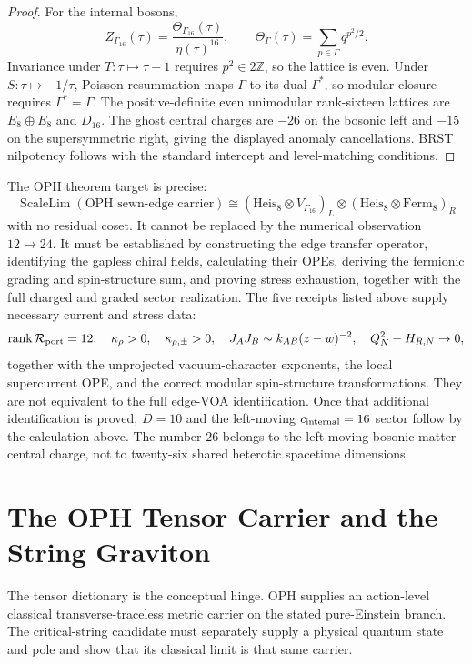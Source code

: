 \documentclass[11pt]{article}
\theoremstyle{remark}
\theoremstyle{plain}
\newcommand{\Z}{\mathbb Z}
\newcommand{\calR}{\mathcal R}
\begin{document}
\begin{proof}
For the internal bosons,
\[
Z_{\Gamma_{16}}(\tau)=\frac{\Theta_{\Gamma_{16}}(\tau)}{\eta(\tau)^{16}},
\qquad
\Theta_\Gamma(\tau)=\sum_{p\in\Gamma}q^{p^2/2}.
\]
Invariance under \(T:\tau\mapsto\tau+1\) requires \(p^2\in2\Z\), so the lattice is even. Under
\(S:\tau\mapsto-1/\tau\), Poisson resummation maps \(\Gamma\) to its dual \(\Gamma^\ast\), so
modular closure requires \(\Gamma^\ast=\Gamma\). The positive-definite even unimodular
rank-sixteen lattices are \(E_8\oplus E_8\) and \(D_{16}^+\). The ghost central charges are
\(-26\) on the bosonic left and \(-15\) on the supersymmetric right, giving the displayed anomaly
cancellations. BRST nilpotency follows with the standard intercept and level-matching conditions.
\end{proof}

The OPH theorem target is precise:
\[
\boxed{
\operatorname{ScaleLim}(\text{OPH sewn-edge carrier})
\cong
\left(\mathrm{Heis}_8\otimes V_{\Gamma_{16}}\right)_L
\otimes
\left(\mathrm{Heis}_8\otimes \mathrm{Ferm}_8\right)_R
}
\]
with no residual coset. It cannot be replaced by the numerical observation \(12\to24\). It must be
established by constructing the edge transfer operator, identifying the gapless chiral fields,
calculating their OPEs, deriving the fermionic grading and spin-structure sum, and proving stress
exhaustion, together with the full charged and graded sector realization.
The five receipts listed above supply necessary current and stress data:
\[
\operatorname{rank}\calR_{\rm port}=12,\quad
\kappa_\rho>0,\quad
\kappa_{\rho,\pm}>0,\quad
J_AJ_B\sim k_{AB}(z-w)^{-2},\quad
Q_N^2-H_{R,N}\to0,
\]
together with the unprojected vacuum-character exponents, the local
supercurrent OPE, and the correct modular spin-structure transformations.
They are not equivalent to the full edge-VOA identification. Once that
additional identification is proved, \(D=10\) and the
left-moving \(c_{\rm internal}=16\) sector follow by the calculation above. The number \(26\)
belongs to the left-moving bosonic matter central charge, not to twenty-six shared heterotic
spacetime dimensions.

\section{The OPH Tensor Carrier and the String Graviton}

The tensor dictionary is the conceptual hinge. OPH supplies an action-level classical
transverse-traceless metric carrier on the stated pure-Einstein branch. The critical-string
candidate must separately supply a physical quantum state and pole and show that its classical
limit is that same carrier.
\end{document}

